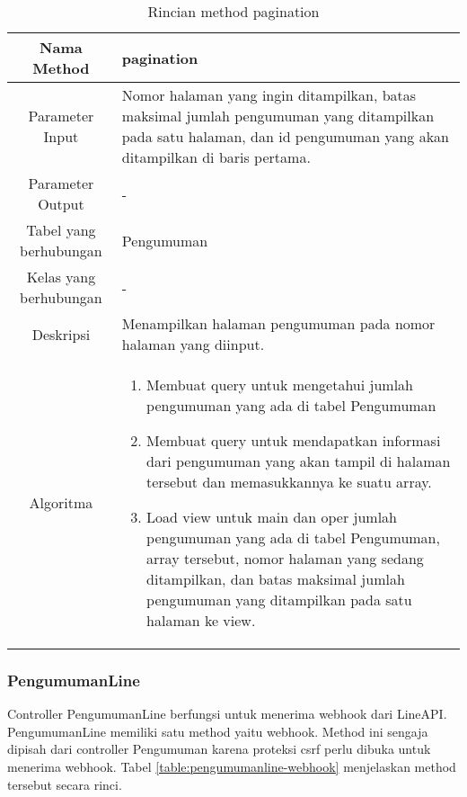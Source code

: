 \begin{center}
	\begin{table}[H]
	\caption{Rincian method pagination}
	\label{table:pengumuman-pagination}
\begin{tabular}{|c|p{11cm}|}
\hline
Nama Method 	& 	 pagination	\\
\hline
Parameter Input &  Nomor halaman yang ingin ditampilkan, batas maksimal jumlah pengumuman yang ditampilkan pada satu halaman, dan id pengumuman yang akan ditampilkan di baris pertama.\\
\hline
Parameter Output & - \\
\hline
Tabel yang berhubungan & Pengumuman \\
\hline
Kelas yang berhubungan & - \\
\hline
Deskripsi	& Menampilkan halaman pengumuman pada nomor halaman yang diinput.\\
\hline
Algoritma	& \begin{enumerate}
				\item Membuat query untuk mengetahui jumlah pengumuman yang ada di tabel Pengumuman				
				\item Membuat query untuk mendapatkan informasi dari pengumuman yang akan tampil di halaman tersebut dan memasukkannya ke suatu array.
				\item Load view untuk main dan oper jumlah pengumuman yang ada di tabel Pengumuman, array tersebut, nomor halaman yang sedang ditampilkan, dan batas maksimal jumlah pengumuman yang ditampilkan pada satu halaman ke view.
				\end{enumerate} \\
\hline
\end{tabular}
\end{table}
\end{center}

\subsubsection{PengumumanLine}
Controller PengumumanLine berfungsi untuk menerima webhook dari LineAPI. PengumumanLine memiliki satu method yaitu webhook. Method ini sengaja dipisah dari controller Pengumuman karena proteksi csrf perlu dibuka untuk menerima webhook. Tabel \ref{table:pengumumanline-webhook} menjelaskan method tersebut secara rinci.

